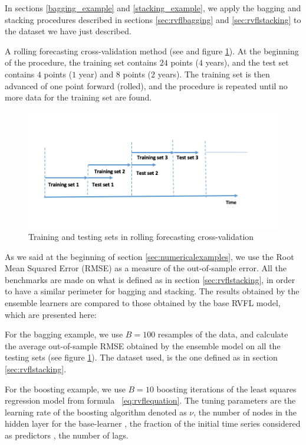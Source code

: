 
In sections \ref{bagging_example} and \ref{stacking_example}, we apply the bagging and stacking procedures described in sections \ref{sec:rvflbagging} and \ref{sec:rvflstacking} to the dataset we have just described. 


A rolling forecasting cross-validation method (see \cite{bergmeir2015note} and figure \ref{rolling_cv}). At the beginning of the procedure, the training set contains $24$ points ($4$ years), and the test set contains $4$ points ($1$ year) and $8$ points ($2$ years). The training set is then advanced of one point forward (rolled), and the procedure is repeated until no more data for the training set are found.  

\begin{figure}[!htb]
\centering
\includegraphics[width=14cm]{gfx/chapter-rvfl-ensembles/rolling_cv.png}
\caption{Training and testing sets in rolling forecasting cross-validation}
\label{rolling_cv}
\end{figure}

As we said at the beginning of section \ref{sec:numericalexamples}, we use the Root Mean Squared Error (RMSE) as a measure of the out-of-sample error. All the benchmarks are made on what is defined as  in section \ref{sec:rvflstacking}, in order to have a similar perimeter for bagging and stacking. The results obtained by the ensemble learners are compared to those obtained by the base RVFL model, which are presented here: 

For the bagging example, we use $B = 100$ resamples of the data, and calculate the average out-of-sample RMSE obtained by the ensemble model on all the testing sets (see figure \ref{rolling_cv}). The dataset used, is the one defined as  in section \ref{sec:rvflstacking}.  

For the boosting example, we use $B = 10$ boosting iterations of the least squares regression model from formula ~\ref{eq:rvflequation}. The tuning parameters are the learning rate of the boosting algorithm denoted as $\nu$, the number of nodes in the hidden layer for the base-learner , the fraction of the initial time series considered as predictors , the number of lags. 

